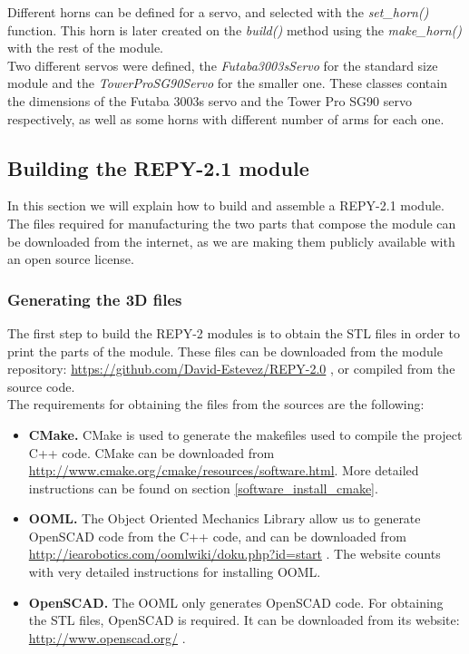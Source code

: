 Different horns can be defined for a servo, and selected with the \emph{set\_horn()} function. This horn is later created on the \emph{build()} method using the \emph{make\_horn()} with the rest of the module.\\

Two different servos were defined, the \emph{Futaba3003sServo} for the standard size module and the \emph{TowerProSG90Servo} for the smaller one. These classes contain the dimensions of the Futaba 3003s servo and the Tower Pro SG90 servo respectively, as well as some horns with different number of arms for each one.\\

\newpage
\subsection{Building the REPY-2.1 module}
\label{hardware_assembly}
In this section we will explain how to build and assemble a REPY-2.1 module. The files required for manufacturing the two parts that compose the module can be downloaded from the internet, as we are making them publicly available with an open source license.

\subsubsection{Generating the 3D files}

The first step to build the REPY-2 modules is to obtain the STL files in order to print the parts of the module. These files can be downloaded from the module repository: \url{https://github.com/David-Estevez/REPY-2.0} , or compiled from the source code.\\

The requirements for obtaining the files from the sources are the following:
\begin{itemize}
	\item \textbf{CMake.} CMake is used to generate the makefiles used to compile the project C++ code. CMake can be downloaded from \url{http://www.cmake.org/cmake/resources/software.html}. More detailed instructions can be found on section \ref{software_install_cmake}.
	
	\item \textbf{OOML.} The Object Oriented Mechanics Library allow us to generate OpenSCAD code from the C++ code, and can be downloaded from \url{http://iearobotics.com/oomlwiki/doku.php?id=start} . The website counts with very detailed instructions for installing OOML.
	
	\item \textbf{OpenSCAD.} The OOML only generates OpenSCAD code. For obtaining the STL files, OpenSCAD is required. It can be downloaded from its website: \url{http://www.openscad.org/} .\\
\end{itemize}

